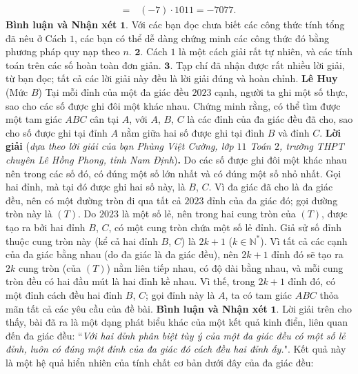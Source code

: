 \begin{multicols}{2}
\begin{align*}
			 = \,&\left( { - 7} \right) \cdot 1011 =  - 7077.
	\end{align*}
	\textbf{\color{thachthuctoanhoc}Bình luận và Nhận xét}
	\vskip 0.05cm
	$\pmb{1.}$ Với các bạn đọc chưa biết các công thức tính tổng đã nêu ở Cách $1$, các bạn có thể dễ dàng chứng minh các công thức đó bằng phương pháp quy nạp theo $n$.
	\vskip 0.05cm
	$\pmb{2.}$ Cách $1$ là một cách giải rất tự nhiên, và các tính toán trên các số hoàn toàn đơn giản.
	\vskip 0.05cm
	$\pmb{3.}$ Tạp chí đã nhận được rất nhiều lời giải, từ bạn đọc; tất cả các lời giải này đều là lời giải đúng và hoàn chỉnh.
	\vskip 0.1cm
		\hfill\textbf{\color{thachthuctoanhoc}Lê Huy}
	\vskip 0.1cm
	{}
	(Mức $B$) Tại mỗi đỉnh của một đa giác đều $2023$ cạnh, người ta ghi một số thực, sao cho các số được ghi đôi một khác nhau. Chứng minh rằng, có thể tìm được một tam giác $ABC$ cân tại $A$, với $A$, $B$, $C$ là các đỉnh của đa giác đều đã cho, sao cho số được ghi tại đỉnh $A$ nằm giữa hai số được ghi tại đỉnh $B$ và đỉnh $C$.
	\vskip 0.05cm
	\textbf{\color{thachthuctoanhoc}Lời giải} (\textit{dựa theo lời giải của bạn Phùng Việt Cường, lớp $11$ Toán $2$, trường THPT chuyên Lê Hồng Phong, tỉnh Nam Định})\textbf{\color{thachthuctoanhoc}.}
	\vskip 0.05cm
	Do các số được ghi đôi một khác nhau nên trong các số đó, có đúng một số lớn nhất và có đúng một số nhỏ nhất. Gọi hai đỉnh, mà tại đó được ghi hai số này, là $B$, $C$.
	\vskip 0.05cm
	Vì đa giác đã cho là đa giác đều, nên có một đường tròn đi qua tất cả $2023$ đỉnh của đa giác đó; gọi đường tròn này là $(T)$.
	\vskip 0.05cm
	Do $2023$ là một số lẻ, nên trong hai cung tròn của $(T)$, được tạo ra bởi hai đỉnh $B$, $C$, có một cung tròn chứa một số lẻ đỉnh. Giả sử số đỉnh thuộc cung tròn này (kể cả hai đỉnh $B$, $C$) là $2k + 1$ ($k \in \mathbb{N^*}$). Vì tất cả các cạnh của đa giác bằng nhau (do đa giác là đa giác đều), nên $2k + 1$ đỉnh đó sẽ tạo ra $2k$ cung tròn (của $(T)$) nằm liên tiếp nhau, có độ dài bằng nhau, và mỗi cung tròn đều có hai đầu mút là hai đỉnh kề nhau. Vì thế, trong $2k + 1$ đỉnh đó, có một đỉnh cách đều hai đỉnh $B$, $C$; gọi đỉnh này là $A$, ta có tam giác $ABC$ thỏa mãn tất cả các yêu cầu của đề bài.
	\vskip 0.05cm
	\textbf{\color{thachthuctoanhoc}Bình luận và Nhận xét}
	\vskip 0.05cm
	$\pmb{1.}$ Lời giải trên cho thấy, bài đã ra là một dạng phát biểu khác của một kết quả kinh điển, liên quan đến đa giác đều: ``\textit{Với hai đỉnh phân biệt tùy ý của một đa giác đều có một số lẻ đỉnh, luôn có đúng một đỉnh của đa giác đó cách đều hai đỉnh ấy.}". Kết quả này là một hệ quả hiển nhiên của tính chất cơ bản dưới đây của đa giác đều:

\end{multicols}
